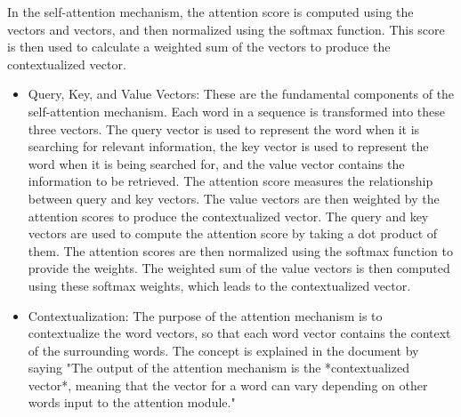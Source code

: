 \documentclass[11pt,addpoints,answers]{exam}
\begin{document}
\begin{questions}
\question[3] In the self-attention mechanism, the attention score is computed using the \fillin[query] vectors and \fillin[key] vectors, and then normalized using the softmax function. This score is then used to calculate a weighted sum of the \fillin[value] vectors to produce the contextualized vector.
\begin{solution}
  \begin{itemize}
    \item Query, Key, and Value Vectors: These are the fundamental components of the self-attention mechanism. Each word in a sequence is transformed into these three vectors. The query vector is used to represent the word when it is searching for relevant information, the key vector is used to represent the word when it is being searched for, and the value vector contains the information to be retrieved. The attention score measures the relationship between query and key vectors. The value vectors are then weighted by the attention scores to produce the contextualized vector. The query and key vectors are used to compute the attention score by taking a dot product of them. The attention scores are then normalized using the softmax function to provide the weights. The weighted sum of the value vectors is then computed using these softmax weights, which leads to the contextualized vector.
    \item Contextualization: The purpose of the attention mechanism is to contextualize the word vectors, so that each word vector contains the context of the surrounding words. The concept is explained in the document by saying "The output of the attention mechanism is the *contextualized vector*, meaning that the vector for a word can vary depending on other words input to the attention module."
  \end{itemize}
\end{solution}




\end{questions}
\end{document}
